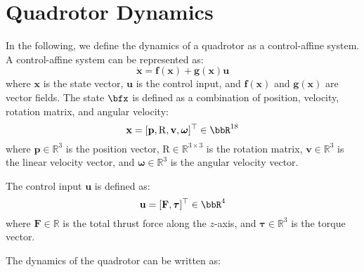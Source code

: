 \section{Quadrotor Dynamics}
\label{sec: quad_eval}

In the following, we define the dynamics of a quadrotor as a control-affine system. A control-affine system can be represented as:
%
\begin{equation}
\dot{\mathbf{x}} = \mathbf{f}(\mathbf{x}) + \mathbf{g}(\mathbf{x})\mathbf{u}
\end{equation}
%
where $\mathbf{x}$ is the state vector, $\mathbf{u}$ is the control input, and $\mathbf{f}(\mathbf{x})$ and $\mathbf{g}(\mathbf{x})$ are vector fields. The state $\bfx$ is defined as a combination of position, velocity, rotation matrix, and angular velocity:
%
\begin{equation}
\mathbf{x} = [\mathbf{p}, \mathrm{R}, \mathbf{v}, \boldsymbol{\omega}]^\top \in \bbR^{18}
\end{equation}
%
where $\mathbf{p} \in \mathbb{R}^3$ is the position vector, $\mathrm{R} \in \mathbb{R}^{3\times 3}$ is the rotation matrix, $\mathbf{v} \in \mathbb{R}^3$ is the linear velocity vector, and $\boldsymbol{\omega} \in \mathbb{R}^3$ is the angular velocity vector.

The control input $\mathbf{u}$ is defined as:
%
\begin{equation}
\mathbf{u} = [\mathbf{F}, \boldsymbol{\tau}]^\top \in \bbR^4
\end{equation}
%
where $\mathbf{F} \in \mathbb{R}$ is the total thrust force along the $z$-axis, and $\boldsymbol{\tau} \in \mathbb{R}^3$ is the torque vector.

The dynamics of the quadrotor can be written as:

